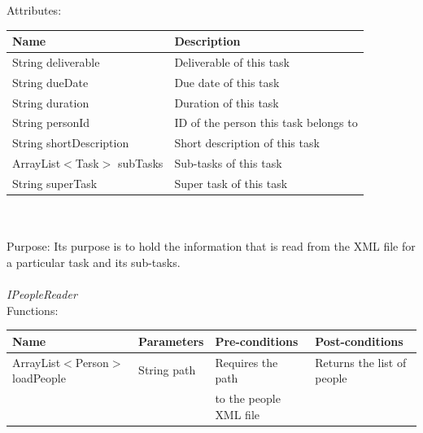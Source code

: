 Attributes:\\
\begin{tabular}{| l | l |}
\hline
 Name                                     	 	& Description\\
\hline
String deliverable			& Deliverable of this task\\
\hline
String dueDate			& Due date of this task\\
\hline
String duration		 		& Duration of this task\\
\hline
String personId			& ID of the person this task belongs to\\
\hline
String shortDescription		& Short description of this task\\
\hline
ArrayList$<$Task$>$ subTasks	& Sub-tasks of this task\\
\hline
String superTask			& Super task of this task\\
\hline
\end{tabular}\\
\\

Purpose: Its purpose is to hold the information that is read from the XML file for a particular task and its sub-tasks.
\\
\\

\emph{IPeopleReader}\\
Functions:\\
\begin{tabular}{| l | l | l | l |}
\hline
Name & Parameters & Pre-conditions & Post-conditions\\
\hline
		ArrayList$<$Person$>$loadPeople 	& String path       			& Requires the path 	& Returns the list of people\\
                                                                                    &                         			 & to the people XML file	& 
\\
\hline
\end{tabular}
\\

